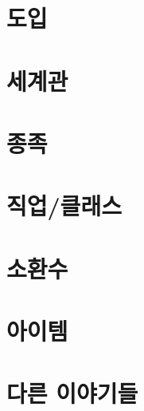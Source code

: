 \documentclass{report}
\begin{document}
	\setcounter{parttocdepth}{2}
	\parttoc
	\setcounter{parttocdepth}{1}
	
	\chapter{도입}
		
	
	\chapter{세계관}
		
	
	\chapter{종족}
		
	
	\chapter{직업/클래스}
		
	
	\chapter{소환수}
		
	
	\chapter{아이템}
		
	
	\chapter{다른 이야기들}
		
\end{document}
